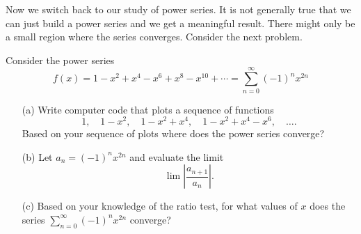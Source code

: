 Now we switch back to our study of power series.  It is not generally true that we can
just build a power series and we get a meaningful result.  There might only be a small
region where the series converges.  Consider the next problem.
\begin{problem}\label{prob:power_series_conv}
    Consider the power series
    \[ f(x) = 1 - x^2 + x^4 - x^6 + x^8 - x^{10} + \cdots = \sum_{n=0}^\infty
        (-1)^{n} x^{2n} \]
    \begin{enumerate}
        \item[(a)] Write computer code that plots a sequence of functions 
            \[ 1, \quad 1-x^2, \quad 1-x^2 + x^4, \quad 1-x^2+x^4-x^6, \quad \ldots. \]
            Based on your sequence of plots where does the power series converge?
        \item[(b)] Let $a_n = (-1)^{n} x^{2n}$ and evaluate the limit 
            \[ \lim \left| \frac{a_{n+1}}{a_n} \right|. \]
        \item[(c)] Based on your knowledge of the ratio test, for what values of $x$ does
            the series $\sum_{n=0}^\infty (-1)^{n} x^{2n}$ converge? 
    \end{enumerate}
\end{problem}

